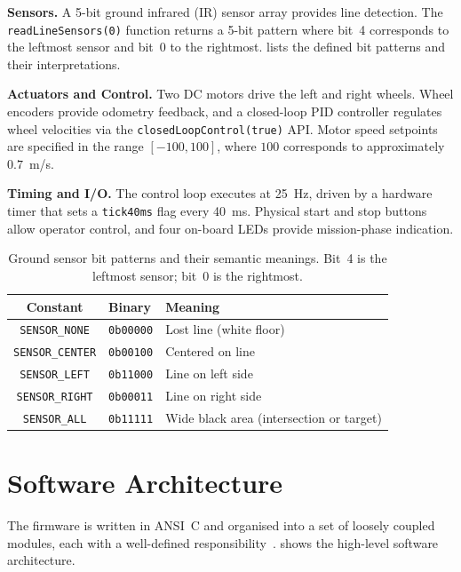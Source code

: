 \documentclass[runningheads]{llncs}
\begin{document}
\textbf{Sensors.} A 5-bit ground infrared (IR) sensor array provides line detection. The \texttt{readLineSensors(0)} function returns a 5-bit pattern where bit~4 corresponds to the leftmost sensor and bit~0 to the rightmost.  lists the defined bit patterns and their interpretations.

\textbf{Actuators and Control.} Two DC motors drive the left and right wheels. Wheel encoders provide odometry feedback, and a closed-loop PID controller regulates wheel velocities via the \texttt{closedLoopControl(true)} API. Motor speed setpoints are specified in the range $[-100, 100]$, where $100$ corresponds to approximately $0.7$~m/s.

\textbf{Timing and I/O.} The control loop executes at 25~Hz, driven by a hardware timer that sets a \texttt{tick40ms} flag every 40~ms. Physical start and stop buttons allow operator control, and four on-board LEDs provide mission-phase indication.

\begin{table}[t]
\centering
\caption{Ground sensor bit patterns and their semantic meanings. Bit~4 is the leftmost sensor; bit~0 is the rightmost.}
\label{fig:sensor-patterns}
\begin{tabular}{@{}cll@{}}
\toprule
\textbf{Constant} & \textbf{Binary} & \textbf{Meaning} \\
\midrule
\texttt{SENSOR\_NONE}   & \texttt{0b00000} & Lost line (white floor) \\
\texttt{SENSOR\_CENTER} & \texttt{0b00100} & Centered on line \\
\texttt{SENSOR\_LEFT}   & \texttt{0b11000} & Line on left side \\
\texttt{SENSOR\_RIGHT}  & \texttt{0b00011} & Line on right side \\
\texttt{SENSOR\_ALL}    & \texttt{0b11111} & Wide black area (intersection or target) \\
\bottomrule
\end{tabular}
\end{table}

\section{Software Architecture}\label{sec:software}

The firmware is written in ANSI~C and organised into a set of loosely coupled modules, each with a well-defined responsibility~\cite{braunl2008}.  shows the high-level software architecture.
\end{document}
